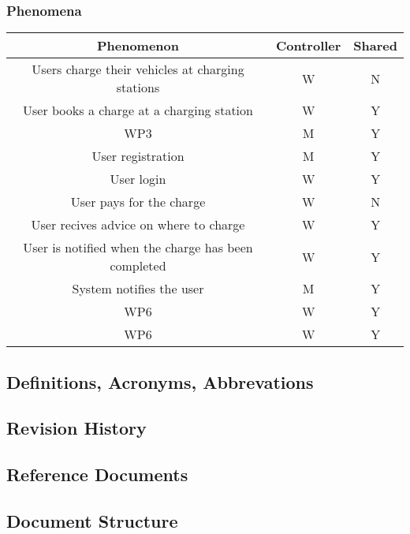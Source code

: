 \subsubsection{Phenomena}
\begin{table}[h]
        \centering
        \begin{tabular}{|c|c|c|}
        \hline
        Phenomenon                                        & Controller & Shared \\ \hline
        Users charge their vehicles at charging stations  & W          & N      \\ \hline
        User books a charge at a charging station         & W          & Y      \\ \hline
        WP3                                               & M          & Y      \\ \hline
        User registration                                 & M          & Y      \\ \hline
        User login                                        & W          & Y      \\ \hline
        User pays for the charge                          & W          & N      \\ \hline
        User recives advice on where to charge            & W          & Y      \\ \hline
        User is notified when the charge has been completed   & W          & Y      \\ \hline
        System notifies the user                          & M          & Y      \\ \hline
        WP6                                               & W          & Y      \\ \hline
        WP6                                               & W          & Y      \\ \hline
        \end{tabular}
\end{table}

\subsection{Definitions, Acronyms, Abbrevations}
\subsection{Revision History}
\subsection{Reference Documents}
\subsection{Document Structure}
